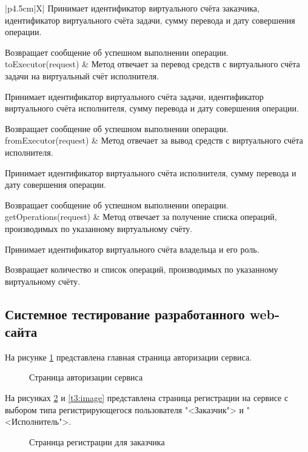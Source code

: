 \begin{xltabular}{\textwidth}{|p{4.5cm}|X|}
	Принимает идентификатор виртуального счёта заказчика, идентификатор виртуального счёта задачи, сумму перевода и дату совершения операции.
	
	Возвращает сообщение об успешном выполнении операции.\\
	\hline toExecutor(request) & Метод отвечает за перевод средств с виртуального счёта задачи на виртуальный счёт исполнителя.
	
	Принимает идентификатор виртуального счёта задачи, идентификатор виртуального счёта исполнителя, сумму перевода и дату совершения операции.
	
	Возвращает сообщение об успешном выполнении операции.\\
	\hline fromExecutor(request) & Метод отвечает за вывод средств с виртуального счёта исполнителя.
	
	Принимает идентификатор виртуального счёта исполнителя, сумму перевода и дату совершения операции.
	
	Возвращает сообщение об успешном выполнении операции.\\
	\hline getOperations(request) & Метод отвечает за получение списка операций, производимых по указанному виртуальному счёту.
	
	Принимает идентификатор виртуального счёта владельца и его роль.
	
	Возвращает количество и список операций, производимых по указанному виртуальному счёту.
\end{xltabular}
\renewcommand{\arraystretch}{1.0} %

\subsection{Системное тестирование разработанного web-сайта}

На рисунке \ref{t1:image} представлена главная страница авторизации сервиса.
\newpage %
\begin{figure}[H] %
\caption{Страница авторизации сервиса}
\label{t1:image}
\end{figure}

На рисунках \ref{t2:image} и \ref{t3:image} представлена страница регистрации на сервисе с выбором типа регистрирующегося пользователя "<Заказчик"> и "<Исполнитель">.

\begin{figure}[ht]
\caption{Страница регистрации для заказчика}
\label{t2:image}
\end{figure}
\clearpage

